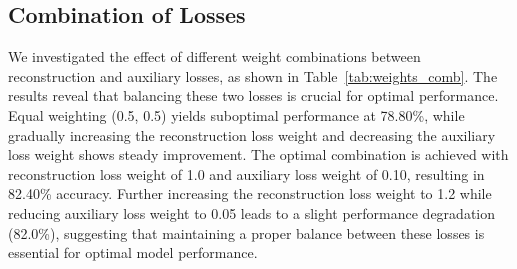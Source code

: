 \begin{table}[htbp]
    \centering
    \caption{Accuracy for different auxiliary loss weights}
    \label{tab:weights_accuracy}
\end{table}

\subsection{Combination of Losses}

We investigated the effect of different weight combinations between reconstruction and auxiliary losses, as shown in Table~\ref{tab:weights_comb}. The results reveal that balancing these two losses is crucial for optimal performance. Equal weighting (0.5, 0.5) yields suboptimal performance at 78.80\%, while gradually increasing the reconstruction loss weight and decreasing the auxiliary loss weight shows steady improvement. The optimal combination is achieved with reconstruction loss weight of 1.0 and auxiliary loss weight of 0.10, resulting in 82.40\% accuracy. Further increasing the reconstruction loss weight to 1.2 while reducing auxiliary loss weight to 0.05 leads to a slight performance degradation (82.0\%), suggesting that maintaining a proper balance between these losses is essential for optimal model performance.

\begin{table}[htbp]
    \centering
    \caption{Accuracy for different combination of reconstruction and auxiliary loss weights}
    \label{tab:weights_comb}
\end{table}

